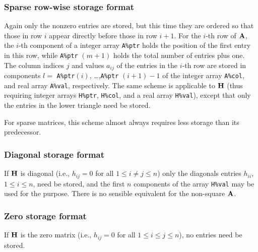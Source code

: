 \documentclass{galahad}
\newcommand{\packagename}{PRESOLVE}
\newcommand{\sym}{\tt\small}
\begin{document}
\subsubsection{Sparse row-wise storage format}\label{rowwise}
Again only the nonzero entries are stored, but this time
they are ordered so that those in row $i$ appear directly before those
in row $i+1$. For the $i$-th row of ${\mathbf{A}}$, the $i$-th component of a
integer array {\tt A\%ptr} holds the position of the first entry in this row,
while {\tt A\%ptr} $(m+1)$ holds the total number of entries plus one.
The column indices $j$ and values $a_{ij}$ of the entries in the $i$-th row
are stored in components
$l =$ {\tt A\%ptr}$(i)$, \ldots ,{\tt A\%ptr} $(i+1)-1$ of the
integer array {\tt A\%col}, and real array {\tt A\%val}, respectively.
The same scheme is applicable to
${\mathbf{H}}$ (thus requiring integer arrays {\tt H\%ptr}, {\tt H\%col}, and
a real array {\tt H\%val}),
except that only the entries in the lower triangle need be stored.

For sparse matrices, this scheme almost always requires less storage than
its predecessor.

\subsubsection{Diagonal storage format}\label{diagonal}
If ${\mathbf{H}}$ is diagonal (i.e., $h_{ij} = 0$ for all $1 \leq i \neq j \leq n$)
only the diagonals entries $h_{ii}$, $1 \leq i \leq n$,  need be stored,
and the first $n$ components of the array {\tt H\%val} may be used for
the purpose. There is no sensible equivalent for the non-square ${\mathbf{A}}$.

\subsubsection{Zero storage format}\label{zero}
If ${\mathbf{H}}$ is the zero matrix (i.e., $h_{ij} = 0$ for all 
$1 \leq i \leq j \leq n$), no entries need be stored.



\end{document}
